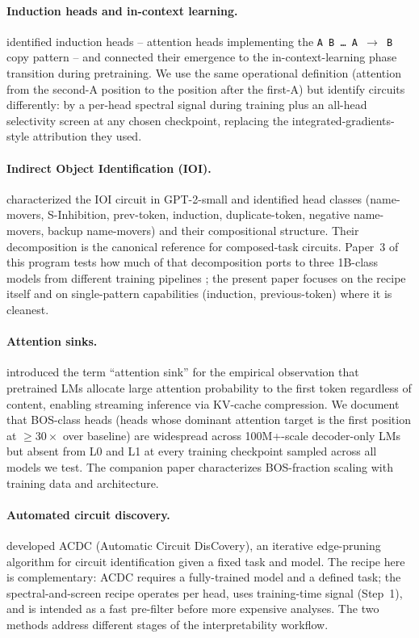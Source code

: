 \documentclass[11pt]{article}
\begin{document}
\paragraph{Induction heads and in-context learning.} \citet{olsson2022induction} identified induction heads -- attention heads implementing the \texttt{A B \dots\ A $\to$ B} copy pattern -- and connected their emergence to the in-context-learning phase transition during pretraining. We use the same operational definition (attention from the second-A position to the position after the first-A) but identify circuits differently: by a per-head spectral signal during training plus an all-head selectivity screen at any chosen checkpoint, replacing the integrated-gradients-style attribution they used.

\paragraph{Indirect Object Identification (IOI).} \citet{wang2022ioi} characterized the IOI circuit in GPT-2-small and identified head classes (name-movers, S-Inhibition, prev-token, induction, duplicate-token, negative name-movers, backup name-movers) and their compositional structure. Their decomposition is the canonical reference for composed-task circuits. Paper~3 of this program tests how much of that decomposition ports to three 1B-class models from different training pipelines \citep{paper3_circuits}; the present paper focuses on the recipe itself and on single-pattern capabilities (induction, previous-token) where it is cleanest.

\paragraph{Attention sinks.} \citet{xiao2024streaming} introduced the term ``attention sink'' for the empirical observation that pretrained LMs allocate large attention probability to the first token regardless of content, enabling streaming inference via KV-cache compression. We document that BOS-class heads (heads whose dominant attention target is the first position at $\geq 30\times$ over baseline) are widespread across 100M+-scale decoder-only LMs but absent from L0 and L1 at every training checkpoint sampled across all models we test. The companion paper \citep{paper2_developmental} characterizes BOS-fraction scaling with training data and architecture.

\paragraph{Automated circuit discovery.} \citet{conmy2023acdc} developed ACDC (Automatic Circuit DisCovery), an iterative edge-pruning algorithm for circuit identification given a fixed task and model. The recipe here is complementary: ACDC requires a fully-trained model and a defined task; the spectral-and-screen recipe operates per head, uses training-time signal (Step~1), and is intended as a fast pre-filter before more expensive analyses. The two methods address different stages of the interpretability workflow.
\end{document}
